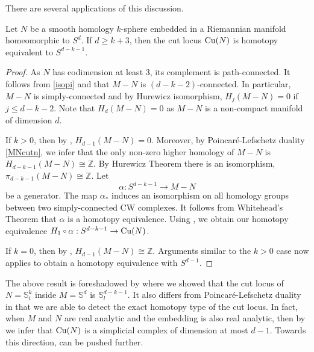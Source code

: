 \vspace{0.3cm}
\hf There are several applications of this discussion.
\begin{thm}\label{homsph}
    Let $N$ be a smooth homology $k$-sphere embedded in a Riemannian manifold homeomorphic to $S^d$. If $d\geq k+3$, then the cut locus $\mathrm{Cu}(N)$ is homotopy equivalent to $S^{d-k-1}$.
\end{thm}
\begin{proof}
    As $N$ has codimension at least $3$, its complement is path-connected. It follows from \eqref{isopi} and   that $M-N$ is $(d-k-2)$-connected. In particular, $M-N$ is simply-connected and by Hurewicz isomorphism, $H_j(M-N)=0$ if $j\leq d-k-2$.  Note that $H_d(M-N)=0$ as $M-N$ is a non-compact manifold of dimension $d$. 

    \vspace{0.1cm}
    \hf If $k>0$, then by  , $H_{d-1}(M-N)=0$. Moreover, by Poincar\'{e}-Lefschetz duality \eqref{MNcutn}, we infer that the only non-zero higher homology of $M-N$ is $H_{d-k-1}(M-N)\cong\mathbb{Z}$. By Hurewicz Theorem there is an isomorphism, $\pi_{d-k-1}(M-N)\cong\mathbb{Z}$. Let 
    \begin{displaymath}
        \alpha:S^{d-k-1}\to M - N
    \end{displaymath}
    be a generator. The map $\alpha_\ast$ induces an isomorphism on all homology groups between two simply-connected CW complexes. It follows from Whitehead's Theorem that $\alpha$ is a homotopy equivalence. Using , we obtain our homotopy equivalence $H_1\comp \alpha:S^{d-k-1}\to \cutn$.

    \vspace{0.1cm}
    \hf If $k=0$, then by , $H_{d-1}(M-N)\cong \mathbb{Z}$. Arguments similar to the $k>0$ case now applies to obtain a homotopy equivalence with $S^{d-1}$.
\end{proof}

\hf The above result is foreshadowed by  where we showed that the cut locus of $N=\mathbb{S}^k_i$ inside $M=\mathbb{S}^d$ is $\mathbb{S}^{d-k-1}_l$. It also differs from Poincar\'{e}-Lefschetz duality in that we are able to detect the exact homotopy type of the cut locus. In fact, when $M$ and $N$ are real analytic and the embedding is also real analytic, then by  we infer that $\mathrm{Cu}(N)$ is a simplicial complex of dimension at most $d-1$. Towards this direction,  can be pushed further.

